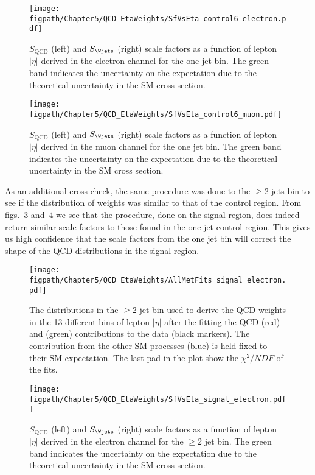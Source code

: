 \begin{figure}[!hbt]
    \centering
    \texttt{[image: \\figpath/Chapter5/QCD\_EtaWeights/SfVsEta\_control6\_electron.pdf]}
    \caption{$S_{\mathrm{QCD}}$ (left) and $S_{\Wjets}$ (right) scale factors as a function of lepton $|\eta|$ derived in the electron channel for the one jet bin. The green band indicates the uncertainty on the \Wjets expectation due to the theoretical uncertainty in the SM cross section.}
    \label{fig:SfVsEta_control6_electron}
\end{figure}

\begin{figure}[!hbt]
    \centering
    \texttt{[image: \\figpath/Chapter5/QCD\_EtaWeights/SfVsEta\_control6\_muon.pdf]}
    \caption{$S_{\mathrm{QCD}}$ (left) and $S_{\Wjets}$ (right) scale factors as a function of lepton $|\eta|$ derived in the muon channel for the one jet bin. The green band indicates the uncertainty on the \Wjets expectation due to the theoretical uncertainty in the SM cross section.}
    \label{fig:SfVsEta_control6_muon}
\end{figure}

As an additional cross check, the same procedure was done to the $\geqslant$2 jets bin to see if the distribution of weights was similar to that of the control region.
From figs.~\ref{fig:AllMetFits_signal_electron} and~\ref{fig:SfVsEta_signal_electron} we see that the procedure, done on the signal region, does indeed return similar scale factors to those found in the one jet control region.
This gives us high confidence that the scale factors from the one jet bin will correct the shape of the QCD distributions in the signal region.

\begin{figure}[!hbt]
    \centering
    \texttt{[image: \\figpath/Chapter5/QCD\_EtaWeights/AllMetFits\_signal\_electron.pdf]}
    \caption{The \ETslash distributions in the $\geqslant$2 jet bin used to derive the QCD weights in the 13 different bins of lepton $|\eta|$ after the fitting the QCD (red) and \Wjets (green) contributions to the data (black markers). The contribution from the other SM processes (blue) is held fixed to their SM expectation. The last pad in the plot show the $\chi^{2}/NDF$ of the fits.}
    \label{fig:AllMetFits_signal_electron}
\end{figure}

\begin{figure}[!hbt]
    \centering
    \texttt{[image: \\figpath/Chapter5/QCD\_EtaWeights/SfVsEta\_signal\_electron.pdf]}
    \caption{$S_{\mathrm{QCD}}$ (left) and $S_{\Wjets}$ (right) scale factors as a function of lepton $|\eta|$ derived in the electron channel for the $\geqslant$2 jet bin. The green band indicates the uncertainty on the \Wjets expectation due to the theoretical uncertainty in the SM cross section.}
    \label{fig:SfVsEta_signal_electron}
\end{figure}

